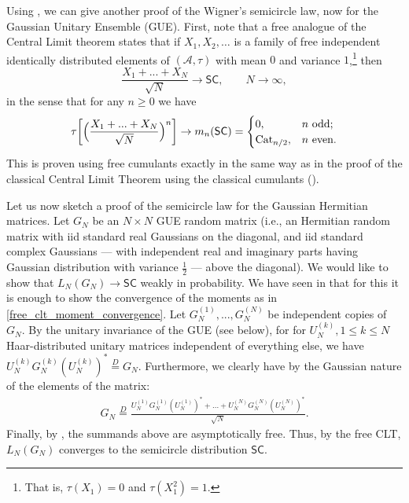 \documentclass[letterpaper,11pt,oneside,reqno]{amsart}
\numberwithin{equation}{section}
\newcommand{\SC}{\mathsf{SC}}
\theoremstyle{definition}
\begin{document}
Using , we can give another proof of the 
Wigner's semicircle law, now for the Gaussian Unitary Ensemble (GUE).
First, note that a free analogue of the Central Limit theorem
states that if $X_1,X_2,\ldots$ is a family of free independent 
identically distributed elements of $(\mathcal{A},\tau)$
with mean $0$ and variance $1$,\footnote{That is,
$\tau(X_1)=0$ and $\tau(X_1^{2})=1$.} then
\begin{equation*}
	\frac{X_1+...+X_N}{\sqrt{N}}\to \SC,\qquad N\to\infty,
\end{equation*}
in the sense that for any $n\ge0$ we have
\begin{equation}\label{free_clt_moment_convergence}
	\tau\bigg[\Big(\frac{X_1+...+X_N}{\sqrt{N}}\Big)^{n}\bigg]\to m_n(\SC)=
	\begin{cases}
		0,&\textnormal{$n$ odd};\\
		\mathrm{Cat}_{n/2},
		&\textnormal{$n$ even}.
	\end{cases}
\end{equation}
This is proven using free cumulants exactly in the same way as in
the proof of the classical Central Limit Theorem using the classical
cumulants ().
	
Let us now sketch a proof of the semicircle law for the Gaussian Hermitian matrices.
Let $G_N$ be an $N\times N$ GUE random matrix (i.e., an Hermitian random
matrix with iid standard real Gaussians on the diagonal, 
and iid standard complex Gaussians --- with independent
real and imaginary parts having Gaussian distribution with variance $\frac 12$
--- above the diagonal). We would like to show that
$L_N(G_N)\to\SC$ weakly in probability. We have seen in  that
for this it is enough to show the convergence of the moments as in \eqref{free_clt_moment_convergence}.
Let $G_N^{(1)},...,G_N^{(N)}$ be independent copies of $G_N$.
By the unitary invariance of the GUE (see  below), for 
for $U_N^{(k)}, 1\leq k\leq N$ Haar-distributed unitary matrices independent of everything else, we have 
$U_N^{(k)}G_N^{(k)}(U_N^{(k)})^*\stackrel{D}{=} G_N$.
Furthermore, we clearly have by the Gaussian nature of the elements of the matrix:
\begin{align*}
    G_N\stackrel{D}{=}\frac{U_N^{(1)}G_N^{(1)}(U^{(1)}_N)^*+...+U_N^{(N)}G_N^{(N)}(U_N^{(N)})^*}{\sqrt{N}}.
\end{align*}
Finally, by ,
the summands above are asymptotically free. Thus, by the free CLT,
$L_N(G_N)$ converges to the semicircle distribution $\SC$. 
\end{document}

